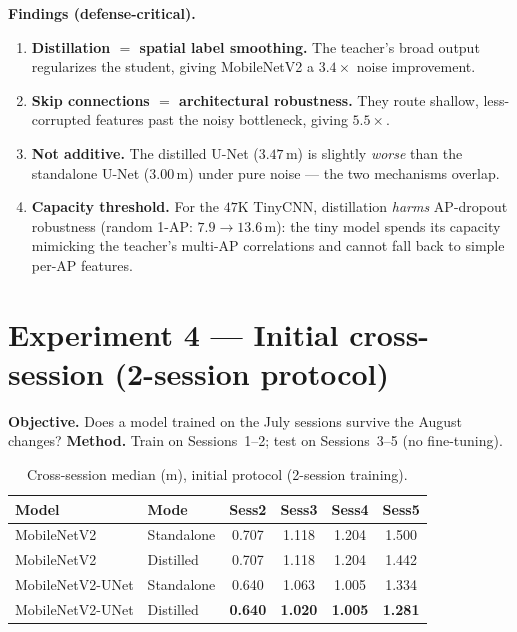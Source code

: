 \documentclass[11pt,a4paper]{article}
\newcommand{\best}[1]{\textcolor{ours}{\textbf{#1}}}
\begin{document}
\textbf{Findings (defense-critical).}
\begin{enumerate}[nosep]
  \item \textbf{Distillation $=$ spatial label smoothing.} The teacher's broad output regularizes
  the student, giving MobileNetV2 a $3.4\times$ noise improvement.
  \item \textbf{Skip connections $=$ architectural robustness.} They route shallow,
  less-corrupted features past the noisy bottleneck, giving $5.5\times$.
  \item \textbf{Not additive.} The distilled U-Net ($3.47$\,m) is slightly \emph{worse} than the
  standalone U-Net ($3.00$\,m) under pure noise --- the two mechanisms overlap.
  \item \textbf{Capacity threshold.} For the $47$K TinyCNN, distillation \emph{harms} AP-dropout
  robustness (random 1-AP: $7.9\!\to\!13.6$\,m): the tiny model spends its capacity mimicking the
  teacher's multi-AP correlations and cannot fall back to simple per-AP features.
\end{enumerate}

\section{Experiment 4 --- Initial cross-session (2-session protocol)}

\textbf{Objective.} Does a model trained on the July sessions survive the August changes?
\textbf{Method.} Train on Sessions~1--2; test on Sessions~3--5 (no fine-tuning).

\begin{table}[H]
\centering
\caption{Cross-session median (m), initial protocol (2-session training).}
\begin{tabular}{@{}llcccc@{}}
\toprule
Model & Mode & Sess2 & Sess3 & Sess4 & Sess5 \\
\midrule
MobileNetV2   & Standalone & 0.707 & 1.118 & 1.204 & 1.500 \\
MobileNetV2   & Distilled  & 0.707 & 1.118 & 1.204 & 1.442 \\
MobileNetV2-UNet & Standalone & 0.640 & 1.063 & 1.005 & 1.334 \\
MobileNetV2-UNet & Distilled  & \best{0.640} & \best{1.020} & \best{1.005} & \best{1.281} \\
\bottomrule
\end{tabular}
\end{table}
\end{document}
